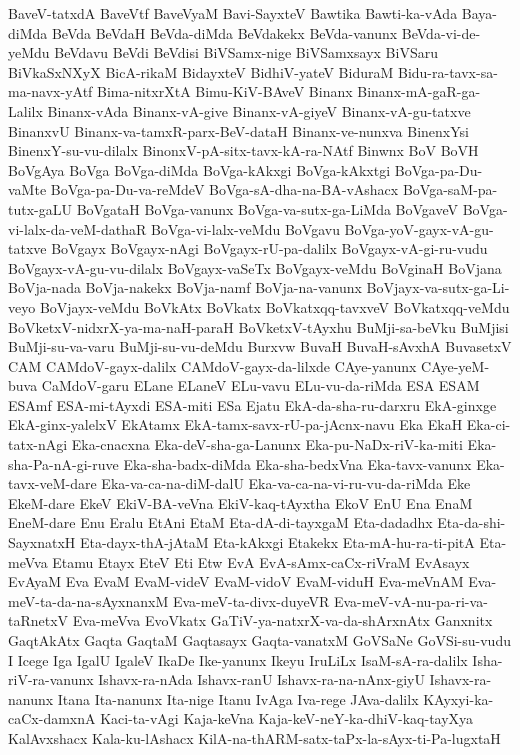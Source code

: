 {BaveV-tatxdA
BaveVtf
BaveVyaM
Bavi-SayxteV
Bawtika
Bawti-ka-vAda
Baya-diMda
BeVda
BeVdaH
BeVda-diMda
BeVdakekx
BeVda-vanunx
BeVda-vi-de-yeMdu
BeVdavu
BeVdi
BeVdisi
BiVSamx-nige
BiVSamxsayx
BiVSaru
BiVkaSxNXyX
BicA-rikaM
BidayxteV
BidhiV-yateV
BiduraM
Bidu-ra-tavx-sa-ma-navx-yAtf
Bima-nitxrXtA
Bimu-KiV-BAveV
Binanx
Binanx-mA-gaR-ga-Lalilx
Binanx-vAda
Binanx-vA-give
Binanx-vA-giyeV
Binanx-vA-gu-tatxve
BinanxvU
Binanx-va-tamxR-parx-BeV-dataH
Binanx-ve-nunxva
BinenxYsi
BinenxY-su-vu-dilalx
BinonxV-pA-sitx-tavx-kA-ra-NAtf
Binwnx
BoV
BoVH
BoVgAya
BoVga
BoVga-diMda
BoVga-kAkxgi
BoVga-kAkxtgi
BoVga-pa-Du-vaMte
BoVga-pa-Du-va-reMdeV
BoVga-sA-dha-na-BA-vAshacx
BoVga-saM-pa-tutx-gaLU
BoVgataH
BoVga-vanunx
BoVga-va-sutx-ga-LiMda
BoVgaveV
BoVga-vi-lalx-da-veM-dathaR
BoVga-vi-lalx-veMdu
BoVgavu
BoVga-yoV-gayx-vA-gu-tatxve
BoVgayx
BoVgayx-nAgi
BoVgayx-rU-pa-dalilx
BoVgayx-vA-gi-ru-vudu
BoVgayx-vA-gu-vu-dilalx
BoVgayx-vaSeTx
BoVgayx-veMdu
BoVginaH
BoVjana
BoVja-nada
BoVja-nakekx
BoVja-namf
BoVja-na-vanunx
BoVjayx-va-sutx-ga-Li-veyo
BoVjayx-veMdu
BoVkAtx
BoVkatx
BoVkatxqq-tavxveV
BoVkatxqq-veMdu
BoVketxV-nidxrX-ya-ma-naH-paraH
BoVketxV-tAyxhu
BuMji-sa-beVku
BuMjisi
BuMji-su-va-varu
BuMji-su-vu-deMdu
Burxvw
BuvaH
BuvaH-sAvxhA
BuvasetxV
CAM
CAMdoV-gayx-dalilx
CAMdoV-gayx-da-lilxde
CAye-yanunx
CAye-yeM-buva
CaMdoV-garu
ELane
ELaneV
ELu-vavu
ELu-vu-da-riMda
ESA
ESAM
ESAmf
ESA-mi-tAyxdi
ESA-miti
ESa
Ejatu
EkA-da-sha-ru-darxru
EkA-ginxge
EkA-ginx-yalelxV
EkAtamx
EkA-tamx-savx-rU-pa-jAcnx-navu
Eka
EkaH
Eka-ci-tatx-nAgi
Eka-cnacxna
Eka-deV-sha-ga-Lanunx
Eka-pu-NaDx-riV-ka-miti
Eka-sha-Pa-nA-gi-ruve
Eka-sha-badx-diMda
Eka-sha-bedxVna
Eka-tavx-vanunx
Eka-tavx-veM-dare
Eka-va-ca-na-diM-dalU
Eka-va-ca-na-vi-ru-vu-da-riMda
Eke
EkeM-dare
EkeV
EkiV-BA-veVna
EkiV-kaq-tAyxtha
EkoV
EnU
Ena
EnaM
EneM-dare
Enu
Eralu
EtAni
EtaM
Eta-dA-di-tayxgaM
Eta-dadadhx
Eta-da-shi-SayxnatxH
Eta-dayx-thA-jAtaM
Eta-kAkxgi
Etakekx
Eta-mA-hu-ra-ti-pitA
Eta-meVva
Etamu
Etayx
EteV
Eti
Etw
EvA
EvA-sAmx-caCx-riVraM
EvAsayx
EvAyaM
Eva
EvaM
EvaM-videV
EvaM-vidoV
EvaM-viduH
Eva-meVnAM
Eva-meV-ta-da-na-sAyxnanxM
Eva-meV-ta-divx-duyeVR
Eva-meV-vA-nu-pa-ri-va-taRnetxV
Eva-meVva
EvoVkatx
GaTiV-ya-natxrX-va-da-shArxnAtx
Ganxnitx
GaqtAkAtx
Gaqta
GaqtaM
Gaqtasayx
Gaqta-vanatxM
GoVSaNe
GoVSi-su-vudu
I
Icege
Iga
IgalU
IgaleV
IkaDe
Ike-yanunx
Ikeyu
IruLiLx
IsaM-sA-ra-dalilx
Isha-riV-ra-vanunx
Ishavx-ra-nAda
Ishavx-ranU
Ishavx-ra-na-nAnx-giyU
Ishavx-ra-nanunx
Itana
Ita-nanunx
Ita-nige
Itanu
IvAga
Iva-rege
JAva-dalilx
KAyxyi-ka-caCx-damxnA
Kaci-ta-vAgi
Kaja-keVna
Kaja-keV-neY-ka-dhiV-kaq-tayXya
KalAvxshacx
Kala-ku-lAshacx
KilA-na-thARM-satx-taPx-la-sAyx-ti-Pa-lugxtaH
}
